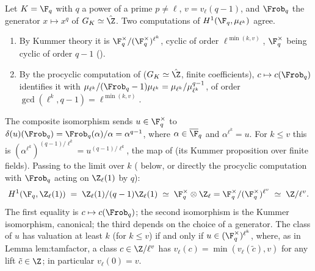 \begin{example}\label{ex:galcoh:kummer-finite-field}
Let $K=\F_q$ with $q$ a power of a prime $p\ne\ell$, $v=v_\ell(q-1)$, and $\Frob_q$ the generator $x\mapsto x^q$ of $G_K\simeq\hat\Z$. Two computations of
$H^1(\F_q,\mu_{\ell^k})$ agree.
\begin{enumerate}[label=(\alph*)]
\item By Kummer theory it is $\F_q^\times/(\F_q^\times)^{\ell^k}$, cyclic of order $\ell^{\min(k,v)}$, $\F_q^\times$ being cyclic of order $q-1$ ().
\item By the procyclic computation of  ($G_K\simeq\hat\Z$, finite coefficients), $c\mapsto c(\Frob_q)$ identifies it with
$\mu_{\ell^k}/(\Frob_q-1)\mu_{\ell^k}=\mu_{\ell^k}/\mu_{\ell^k}^{q-1}$, of order $\gcd(\ell^k,q-1)=\ell^{\min(k,v)}$.
\end{enumerate}
The composite isomorphism sends $u\in\F_q^\times$ to $\delta(u)(\Frob_q)=\Frob_q(\alpha)/\alpha=\alpha^{q-1}$, where $\alpha\in\overline\F_q$ and $\alpha^{\ell^k}=u$. For $k\le v$
this is $(\alpha^{\ell^k})^{(q-1)/\ell^k}=u^{(q-1)/\ell^k}$, the map of  (its Kummer proposition over finite fields). Passing to the limit over $k$
( below, or directly the procyclic computation with $\Frob_q$ acting on $\Z_\ell(1)$ by $q$):
\[
H^1(\F_q,\Z_\ell(1))\;=\;\Z_\ell(1)/(q-1)\Z_\ell(1)\;\simeq\;\F_q^\times\otimes\Z_\ell=\F_q^\times/(\F_q^\times)^{\ell^v}\;\simeq\;\Z/\ell^v .
\]
The first equality is $c\mapsto c(\Frob_q)$; the second isomorphism is the Kummer isomorphism, canonical; the third depends on the choice of a generator. The
class of $u$ has valuation at least $k$ (for $k\le v$) if and only if $u\in(\F_q^\times)^{\ell^k}$, where, as in Lemma lem:tamfactor, a class $c\in\Z/\ell^v$ has
$v_\ell(c)=\min(v_\ell(\tilde c),v)$ for any lift $\tilde c\in\Z$; in particular $v_\ell(0)=v$.
\end{example}

